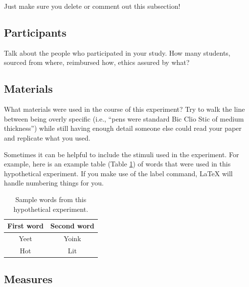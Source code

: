 \documentclass[stu,12pt,floatsintext,justification]{apa7_ula}
\begin{document}
Just make sure you delete or comment out this subsection!

\subsection{Participants}

Talk about the people who participated in your study. How many students,
sourced from where, reimbursed how, ethics assured by what?

\subsection{Materials}

What materials were used in the course of this experiment? Try to walk the line
between being overly specific (i.e., ``pens were standard Bic Clio Stic of
medium thickness'') while still having enough detail someone else could read
your paper and replicate what you used.

Sometimes it can be helpful to include the stimuli used in the experiment. For
example, here is an example table (Table \ref{tab:table_words}) of words that
were used in this hypothetical experiment. If you make use of the label
command, \LaTeX{} will handle numbering things for you.

\begin{table}
    \caption{Sample words from this hypothetical experiment.}
    \centering
    \begin{tabular}{cc} %
        \hline
        First word & Second word \\
        \hline
        Yeet       & Yoink       \\
        Hot        & Lit         \\
        \hline
    \end{tabular}
    \label{tab:table_words}
\end{table}

\subsection{Measures}
\end{document}
